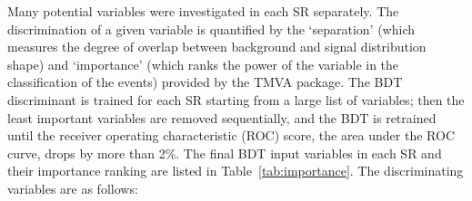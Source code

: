 Many potential variables were investigated in each SR separately. The discrimination of a given variable is quantified by the `separation' (which measures the degree of overlap between background and signal distribution shape) and `importance' (which ranks the power of the variable in the classification of the events) provided by the TMVA package. %
The BDT discriminant is trained for each SR starting from a large list of variables; then the least important variables are removed sequentially, and the BDT is retrained until the
receiver operating characteristic (ROC) score, the area under the ROC curve, drops by more than 2\%.
The final BDT input variables in each SR and their importance ranking are listed in Table~\ref{tab:importance}. The discriminating variables are as follows:
